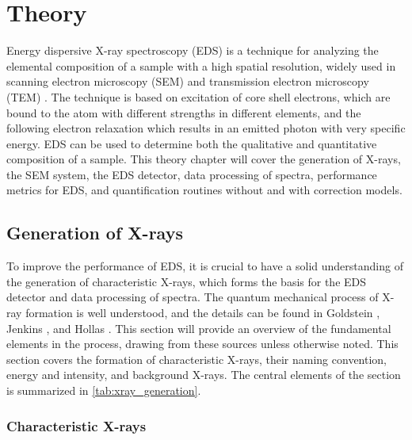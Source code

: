 \chapter{Theory}
\label{ch:theory}

Energy dispersive X-ray spectroscopy (EDS) is a technique for analyzing the elemental composition of a sample with a high spatial resolution, widely used in scanning electron microscopy (SEM) and transmission electron microscopy (TEM) \cite{goldstein_scanning_2018,williams_carter_tem_2009}.
The technique is based on excitation of core shell electrons, which are bound to the atom with different strengths in different elements, and the following electron relaxation which results in an emitted photon with very specific energy.
EDS can be used to determine both the qualitative and quantitative composition of a sample.
This theory chapter will cover the generation of X-rays, the SEM system, the EDS detector, data processing of spectra, performance metrics for EDS, and quantification routines without and with correction models.



\section{Generation of X-rays}
\label{theory:xray_formation}

To improve the performance of EDS, it is crucial to have a solid understanding of the generation of characteristic X-rays, which forms the basis for the EDS detector and data processing of spectra.
The quantum mechanical process of X-ray formation is well understood, and the details can be found in Goldstein \cite[Ch. 4.2]{goldstein_scanning_2018}, Jenkins \cite{jenkins_xrayspectroscopy}, and Hollas \cite[Ch. 8.2]{hollas_modern_2004}.
This section will provide an overview of the fundamental elements in the process, drawing from these sources unless otherwise noted.
This section covers the formation of characteristic X-rays, their naming convention, energy and intensity, and background X-rays.
The central elements of the section is summarized in \cref{tab:xray_generation}.




\subsection{Characteristic X-rays}
\label{theory:xray_formation:characteristic}

